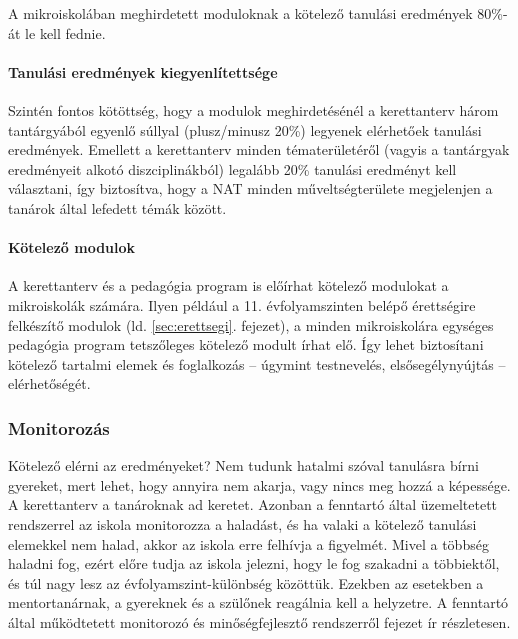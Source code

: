 A mikroiskolában meghirdetett moduloknak a kötelező tanulási eredmények 80\%-át
le kell fednie.

\paragraph{Tanulási eredmények kiegyenlítettsége}

Szintén fontos kötöttség, hogy a modulok meghirdetésénél a kerettanterv
három tantárgyából egyenlő súllyal (plusz/minusz 20\%) legyenek
elérhetőek tanulási eredmények. Emellett a kerettanterv minden
tématerületéről (vagyis a tantárgyak eredményeit alkotó diszciplinákból)
legalább 20\% tanulási eredményt kell választani, így biztosítva, hogy a
NAT minden műveltségterülete megjelenjen a tanárok által lefedett témák
között.

\paragraph{Kötelező modulok}
A kerettanterv és a pedagógia program is előírhat kötelező modulokat
a mikroiskolák számára. Ilyen például a 11. évfolyamszinten belépő érettségire
felkészítő modulok (ld. \ref{sec:erettsegi}. fejezet), a minden mikroiskolára
egységes
pedagógia program tetszőleges kötelező modult írhat elő. Így lehet biztosítani
kötelező
tartalmi elemek és foglalkozás -- úgymint testnevelés, elsősegélynyújtás --
elérhetőségét.

\subsubsection{Monitorozás}

Kötelező elérni az eredményeket? Nem tudunk hatalmi szóval tanulásra
bírni gyereket, mert lehet, hogy annyira nem akarja, vagy nincs meg
hozzá a képessége. A kerettanterv a tanároknak ad keretet. Azonban a
fenntartó által üzemeltetett rendszerrel az iskola  monitorozza a
haladást, és ha valaki a kötelező tanulási elemekkel nem halad, akkor
az iskola erre felhívja a figyelmét. Mivel a többség haladni fog, ezért előre
tudja az iskola jelezni,
hogy le fog szakadni a többiektől, és túl nagy lesz az évfolyamszint-különbség közöttük. Ezekben az esetekben a mentortanárnak, a
gyereknek és a szülőnek reagálnia kell a helyzetre. A fenntartó által működtetett monitorozó
és minőségfejlesztő rendszerről  fejezet ír
részletesen.